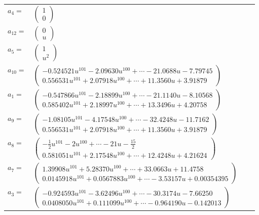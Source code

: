 \documentclass[1p]{elsarticle_modified}
\theoremstyle{definition}
\begin{document}
\begin{tabular}{m{7pt} m{180pt} m{7pt} m{180pt} }
\flushright $a_{4}=$&$\begin{pmatrix}1\\0\end{pmatrix}$ \\
\flushright $a_{12}=$&$\begin{pmatrix}0\\u\end{pmatrix}$ \\
\flushright $a_{5}=$&$\begin{pmatrix}1\\u^2\end{pmatrix}$ \\
\flushright $a_{10}=$&$\begin{pmatrix}-0.524521 u^{101}-2.09630 u^{100}+\cdots-21.0688 u-7.79745\\0.556531 u^{101}+2.07918 u^{100}+\cdots+11.3560 u+3.91879\end{pmatrix}$ \\
\flushright $a_{1}=$&$\begin{pmatrix}-0.547866 u^{101}-2.18899 u^{100}+\cdots-21.1140 u-8.10568\\0.585402 u^{101}+2.18997 u^{100}+\cdots+13.3496 u+4.20758\end{pmatrix}$ \\
\flushright $a_{9}=$&$\begin{pmatrix}-1.08105 u^{101}-4.17548 u^{100}+\cdots-32.4248 u-11.7162\\0.556531 u^{101}+2.07918 u^{100}+\cdots+11.3560 u+3.91879\end{pmatrix}$ \\
\flushright $a_{8}=$&$\begin{pmatrix}-\frac{1}{2} u^{101}-2 u^{100}+\cdots-21 u-\frac{15}{2}\\0.581051 u^{101}+2.17548 u^{100}+\cdots+12.4248 u+4.21624\end{pmatrix}$ \\
\flushright $a_{7}=$&$\begin{pmatrix}1.39908 u^{101}+5.28370 u^{100}+\cdots+33.0663 u+11.4758\\0.0145918 u^{101}+0.0567883 u^{100}+\cdots-3.53157 u+0.00354395\end{pmatrix}$ \\
\flushright $a_{3}=$&$\begin{pmatrix}-0.924593 u^{101}-3.62496 u^{100}+\cdots-30.3174 u-7.66250\\0.0408050 u^{101}+0.111099 u^{100}+\cdots-0.964190 u-0.142013\end{pmatrix}$ \\

\end{tabular}
\end{document}
